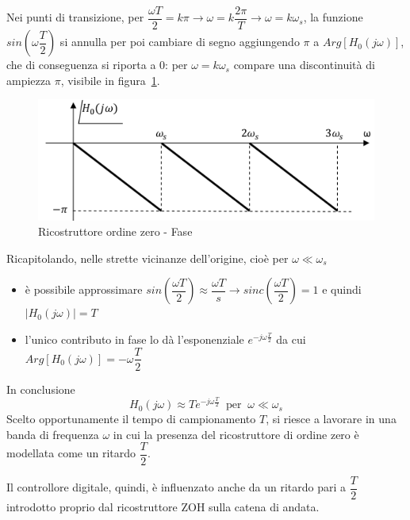 \documentclass[a4paper]{report}
\begin{document}
Nei punti di transizione, per $\dfrac{\omega T}{2} = k \pi \rightarrow
\omega = k \dfrac{2 \pi}{T} \rightarrow \omega = k \omega_s$, la
funzione $sin \left( \omega \dfrac{T}{2}\right)$ si annulla per poi
cambiare di segno aggiungendo $\pi$ a $Arg[H_0(j \omega)]$, che di
conseguenza si riporta a 0: per $\omega = k \omega_s$ compare una
discontinuit\`a di ampiezza $\pi$, visibile in
figura~\ref{fig:ricostruttoreOrdineZeroSpettroFase}.
\begin{figure}[!h]
  \begin{center}
    \includegraphics[scale=0.5]{./figures/ricostruttoreOrdineZeroSpettroFase.png}
    \caption{Ricostruttore ordine zero -
      Fase}\label{fig:ricostruttoreOrdineZeroSpettroFase} 
  \end{center}
\end{figure}

Ricapitolando, nelle strette vicinanze dell'origine, cio\`e per
$\omega \ll \omega_s$
\begin{itemize}
\item \`e possibile approssimare $sin \left( \dfrac{\omega
  T}{2}\right) \approx \dfrac{\omega T}{s} \rightarrow sinc \left(
  \dfrac{\omega T}{2}\right) = 1$ e quindi $|H_0(j \omega)| = T$
\item l'unico contributo in fase lo d\`a l'esponenziale $e^{-j \omega
  \frac{T}{2}}$ da cui $Arg[H_0(j \omega)] = - \omega \dfrac{T}{2}$
\end{itemize}

In conclusione
\begin{equation}
  H_0(j \omega) \approx T e^{-j \omega \frac{T}{2}}
  \;\;\textrm{per}\;\; \omega \ll \omega_s
\end{equation}
Scelto opportunamente il tempo di campionamento $T$, si riesce a
lavorare in una banda di frequenza $\omega$ in cui la presenza del
ricostruttore di ordine zero \`e modellata come un ritardo
$\dfrac{T}{2}$.

Il controllore digitale, quindi, \`e influenzato anche da un ritardo
pari a $\dfrac{T}{2}$ introdotto proprio dal ricostruttore ZOH sulla
catena di andata.
\end{document}

